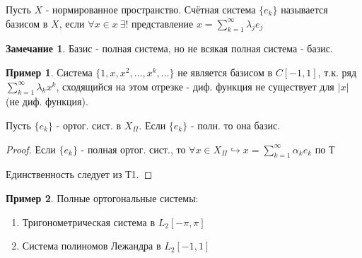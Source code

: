 \documentclass{article}
\theoremstyle{definition}
\numberwithin{theorem}{section}
\numberwithin{lemma}{section}
\numberwithin{definition}{section}
\numberwithin{corollary}{section}
\newtheorem*{eg}{Пример}
\newtheorem*{remark}{Замечание}
\numberwithin{equation}{section}
\let\true\hookrightarrow
\begin{document}
\begin{definition}
  Пусть $X$ - нормированное пространство. Счётная система $\{e_k\}$ называется базисом в $X$,
  если $\forall x \in x \ \exists !$ представление $x=\sum_{k=1}^{\infty}\lambda_je_j$
\end{definition}
\begin{remark}
  Базис - полная система, но не всякая полная система - базис.
\end{remark}
\begin{eg}
  Система $\{1,x,x^{2},\dots ,x^{k},\dots \}$ не является базисом в $C[-1,1]$,
  т.к. ряд $\sum_{k=1}^{\infty}\lambda_kx^{k}$, сходящийся на этом отрезке
  - диф. функция не существует для $|x|$ (не диф. функция).
\end{eg}
\begin{theorem}[Т9]
  Пусть $\{e_k\}$ - ортог. сист. в $X_\Pi$. Если $\{e_k\}$ - полн. то она базис.
\end{theorem}
\begin{proof}
  Если $\{e_k\}$ - полная ортог. сист., то $\forall x \in X_\Pi \true x = \sum_{k=1}^{\infty}\alpha_ke_k$ по Т%

  Единственность следует из Т1.
\end{proof}
\begin{eg}
  Полные ортогональные системы:
  \begin{enumerate}
    \item Тригонометрическая система в $L_2[-\pi,\pi]$
    \item Система полиномов Лежандра в $L_2[-1,1]$
  \end{enumerate}
\end{eg}
\end{document}
